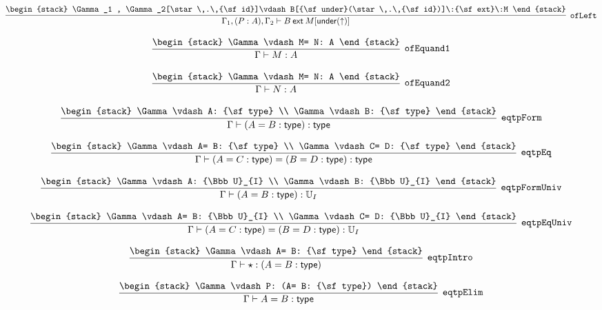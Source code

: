 \[
\infer[{\tt ofLeft}]{\Gamma_1 ,(P: A), \Gamma_2 \vdash B\:{\sf ext}\:M[{\sf under}(\uparrow )]}{
\begin{stack}
\Gamma_1 , \Gamma_2[\star \,.\,{\sf id}]\vdash B[{\sf under}(\star \,.\,{\sf id})]\:{\sf ext}\:M
\end{stack}}
\]

\[
\infer[{\tt ofEquand1}]{\Gamma \vdash M: A}{
\begin{stack}
\Gamma \vdash M= N: A
\end{stack}}
\]

\[
\infer[{\tt ofEquand2}]{\Gamma \vdash N: A}{
\begin{stack}
\Gamma \vdash M= N: A
\end{stack}}
\]

\[
\infer[{\tt eqtpForm}]{\Gamma \vdash (A= B: {\sf type}): {\sf type}}{
\begin{stack}
\Gamma \vdash A: {\sf type}
\\
\Gamma \vdash B: {\sf type}
\end{stack}}
\]

\[
\infer[{\tt eqtpEq}]{\Gamma \vdash (A= C: {\sf type})= (B= D: {\sf type}): {\sf type}}{
\begin{stack}
\Gamma \vdash A= B: {\sf type}
\\
\Gamma \vdash C= D: {\sf type}
\end{stack}}
\]

\[
\infer[{\tt eqtpFormUniv}]{\Gamma \vdash (A= B: {\sf type}): {\Bbb U}_{I}}{
\begin{stack}
\Gamma \vdash A: {\Bbb U}_{I}
\\
\Gamma \vdash B: {\Bbb U}_{I}
\end{stack}}
\]

\[
\infer[{\tt eqtpEqUniv}]{\Gamma \vdash (A= C: {\sf type})= (B= D: {\sf type}): {\Bbb U}_{I}}{
\begin{stack}
\Gamma \vdash A= B: {\Bbb U}_{I}
\\
\Gamma \vdash C= D: {\Bbb U}_{I}
\end{stack}}
\]

\[
\infer[{\tt eqtpIntro}]{\Gamma \vdash \star : (A= B: {\sf type})}{
\begin{stack}
\Gamma \vdash A= B: {\sf type}
\end{stack}}
\]

\[
\infer[{\tt eqtpElim}]{\Gamma \vdash A= B: {\sf type}}{
\begin{stack}
\Gamma \vdash P: (A= B: {\sf type})
\end{stack}}
\]

